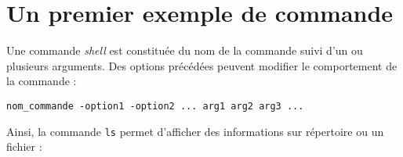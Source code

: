 \documentclass[
  11pt,
]{article}
\begin{document}
\hypertarget{un-premier-exemple-de-commande}{%
\section{Un premier exemple de
commande}\label{un-premier-exemple-de-commande}}

Une commande \emph{shell} est constituée du nom de la commande suivi
d'un ou plusieurs arguments. Des options précédées peuvent modifier le
comportement de la commande :

\begin{verbatim}
nom_commande -option1 -option2 ... arg1 arg2 arg3 ... 
\end{verbatim}

Ainsi, la commande \texttt{ls} permet d'afficher des informations sur
répertoire ou un fichier :
\end{document}
